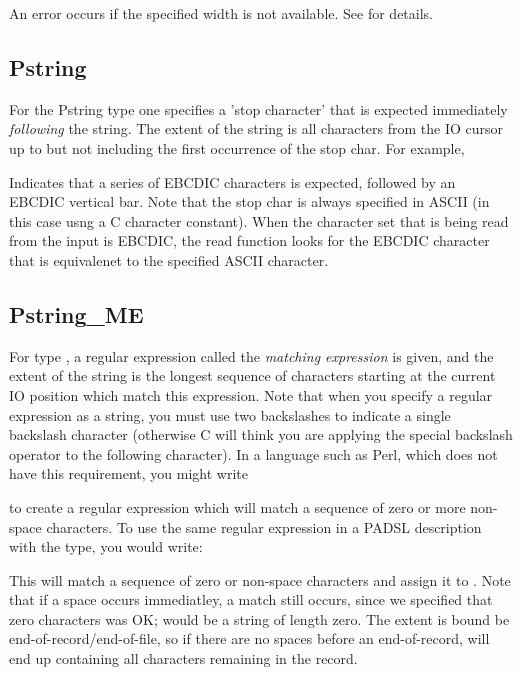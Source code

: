 An error occurs if the specified width is not available.  See 
for details.

\subsection{Pstring}

\aedBegin{}
\aedEnd{}

For the Pstring type one specifies a 'stop character' that is
expected immediately {\em following\/} the string.  The extent of the
string is all characters from the IO cursor up
to but not including the first occurrence of the stop char.
For example,

%
\noindent
Indicates that a series of EBCDIC characters is expected, followed by
an EBCDIC vertical bar.  Note that the stop char is always specified
in ASCII (in this case usng a C character constant).  When the
character set that is being read from the input is EBCDIC, the read
function looks for the EBCDIC character that is equivalenet to the
specified ASCII character.

\subsection{Pstring\_ME}

\aedBegin{}
\aedEnd{}

For type , a regular expression called the {\em matching
expression\/} is given, and the extent of the string is the longest
sequence of characters starting at the current IO position which match
this expression.  Note that when you specify a regular expression as
a \C{} string, you must use two backslashes to indicate a single
backslash character (otherwise C will think you are applying the
special backslash operator to the following character). 
In a language such as Perl, which does not have this requirement,
you might write

%
\noindent
to create a regular expression which will match a
sequence of zero or more non-space characters.  To use the
same regular expression in a PADSL description
with the  type, you would write:

%
\noindent
This will match a sequence of zero or non-space characters and assign
it to .  Note that if a space occurs immediatley, a match
still occurs, since we specified that zero characters was OK;
 would be a string of length zero.  The extent is bound be
end-of-record/end-of-file, so if there are no spaces before an
end-of-record,  will end up containing all characters
remaining in the record.


